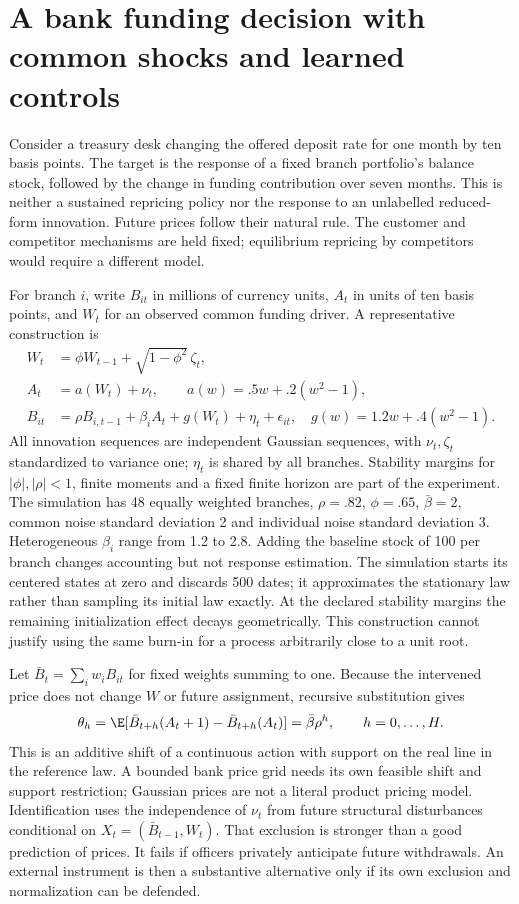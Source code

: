 \section{A bank funding decision with common shocks and learned controls}
\label{s6:funding}
Consider a treasury desk changing the offered deposit rate for one month by
ten basis points. The target is the response of a fixed branch portfolio's
balance stock, followed by the change in funding contribution over seven
months. This is neither a sustained repricing policy nor the response to an
unlabelled reduced-form innovation. Future prices follow their natural rule.
The customer and competitor mechanisms are held fixed; equilibrium repricing
by competitors would require a different model.

For branch $i$, write $B_{it}$ in millions of currency units, $A_t$ in units
of ten basis points, and $W_t$ for an observed common funding driver. A
representative construction is
\begin{align}
 W_t&=\phi W_{t-1}+\sqrt{1-\phi^2}\,\zeta_t,\nonumber\\
 A_t&=a(W_t)+\nu_t,\qquad a(w)=.5w+.2(w^2-1),\nonumber\\
 B_{it}&=\rho B_{i,t-1}+\beta_i A_t+g(W_t)+\eta_t+\epsilon_{it},
 \quad g(w)=1.2w+.4(w^2-1).\label{s6:funding-law}
\end{align}
All innovation sequences are independent Gaussian sequences, with
$\nu_t,\zeta_t$ standardized to variance one; $\eta_t$ is
shared by all branches. Stability margins for $|\phi|,|\rho|<1$, finite
moments and a fixed finite horizon are part of the experiment. The
simulation has 48 equally weighted branches, $\rho=.82$, $\phi=.65$,
$\bar\beta=2$, common noise standard deviation 2 and individual noise
standard deviation 3. Heterogeneous $\beta_i$ range from 1.2 to 2.8.
Adding the baseline stock of 100 per branch changes accounting but not
response estimation.
The simulation starts its centered states at zero and discards 500 dates;
it approximates the stationary law rather than sampling its initial law
exactly. At the declared stability margins the remaining initialization
effect decays geometrically. This construction cannot justify using the
same burn-in for a process arbitrarily close to a unit root.

Let $\bar B_t=\sum_iw_iB_{it}$ for fixed weights summing to one. Because
the intervened price does not change $W$ or future assignment, recursive
substitution gives
\[
 \theta_h=\E[\bar B_{t+h}(A_t+1)-\bar B_{t+h}(A_t)]
       =\bar\beta\rho^h,\qquad h=0,\ldots,H.
\]
This is an additive shift of a continuous action with support on the real
line in the reference law. A bounded bank price grid needs its own feasible
shift and support restriction; Gaussian prices are not a literal product
pricing model. Identification uses the independence of $\nu_t$ from future
structural disturbances conditional on
$X_t=(\bar B_{t-1},W_t)$. That exclusion is stronger than a good prediction
of prices. It fails if officers privately anticipate future withdrawals.
An external instrument is then a substantive alternative only if its own
exclusion and normalization can be defended.

